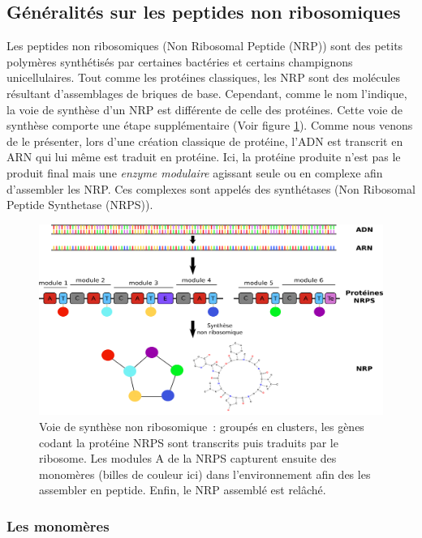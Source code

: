 \subsection{Généralités sur les peptides non ribosomiques}
Les peptides non ribosomiques (Non Ribosomal Peptide (NRP)) sont des petits polymères synthétisés par certaines bactéries et certains champignons unicellulaires.
Tout comme les protéines classiques, les NRP sont des molécules résultant d'assemblages de briques de base.
Cependant, comme le nom l'indique, la voie de synthèse d'un NRP est différente de celle des protéines.
Cette voie de synthèse comporte une étape supplémentaire (Voir figure \ref{global}).
Comme nous venons de le présenter, lors d'une création classique de protéine, l'ADN est transcrit en ARN qui lui même est traduit en protéine.
Ici, la protéine produite n'est pas le produit final mais une \textit{enzyme modulaire} agissant seule ou en complexe afin d'assembler les NRP.
Ces complexes sont appelés des synthétases (Non Ribosomal Peptide Synthetase (NRPS)).

\begin{figure}[h!]
  \begin{center}
    \includegraphics[width=450px]{Figures/bio/Intro/synthese.png}
    \caption{\label{global}Voie de synthèse non ribosomique~:
    groupés en clusters, les gènes codant la protéine NRPS sont transcrits puis traduits par le ribosome.
    Les modules A de la NRPS capturent ensuite des monomères (billes de couleur ici) dans l'environnement afin des les assembler en peptide.
    Enfin, le NRP assemblé est relâché.
    }
  \end{center}
\end{figure}

\subsubsection{Les monomères}

